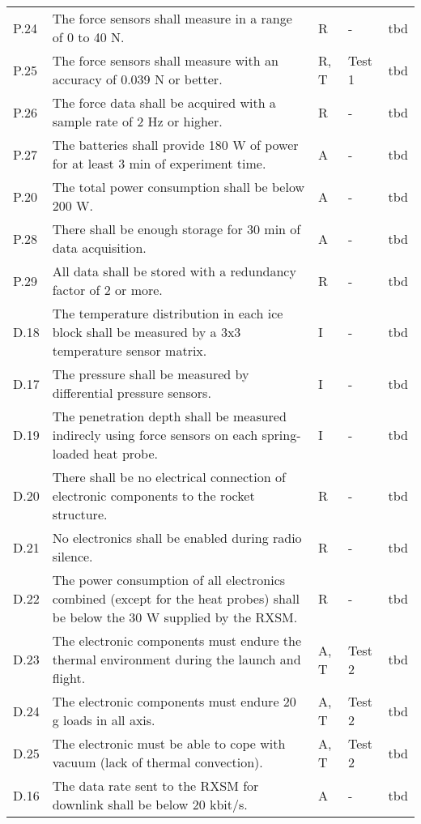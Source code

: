 \documentclass[11pt]{scrartcl}
\begin{document}
\begin{center}
\begin{longtable}{| p{} | p{} | p{} | p{} | p{} |}
		P.24 & The force sensors shall measure in a range of 0 to 40 N. & R & - & tbd \\
		P.25 & The force sensors shall measure with an accuracy of 0.039 N or better. & R, T & Test 1 & tbd \\
		P.26 & The force data shall be acquired with a sample rate of 2 Hz or higher. & R & - & tbd \\
		P.27 & The batteries shall provide 180 W of power for at least 3 min of experiment time. & A & - & tbd \\
		P.20 & The total power consumption shall be below 200 W. & A & - & tbd \\
		P.28 & There shall be enough storage for 30 min of data acquisition. & A & - & tbd \\
		P.29 & All data shall be stored with a redundancy factor of 2 or more. & R & - & tbd \\
		\hline
		D.18 & The temperature distribution in each ice block shall be measured by a 3x3 temperature sensor matrix. & I & - & tbd \\
		D.17 & The pressure shall be measured by differential pressure sensors. & I & - & tbd \\
		D.19 & The penetration depth shall be measured indirecly using force sensors on each spring-loaded heat probe. & I & - & tbd \\
		D.20 & There shall be no electrical connection of electronic components to the rocket structure. & R & - & tbd \\
		D.21 & No electronics shall be enabled during radio silence. & R & - & tbd \\
		D.22 & The power consumption of all electronics combined (except for the heat probes) shall be below the 30 W supplied by the RXSM. & R & - & tbd \\
		D.23 & The electronic components must endure the thermal environment during the launch and flight. & A, T & Test 2 & tbd \\
		D.24 & The electronic components must endure 20 g loads in all axis. & A, T & Test 2 & tbd \\
		D.25 & The electronic must be able to cope with vacuum (lack of thermal convection). & A, T & Test 2 & tbd \\
		D.16 & The data rate sent to the RXSM for downlink shall be below 20 kbit/s. & A & - & tbd \\
		

\end{longtable}
\end{center}
\end{document}
